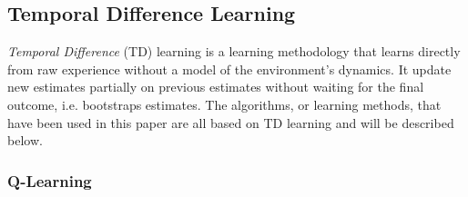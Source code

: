 \documentclass[result.tex]{subfiles}
\begin{document}


    \subsection*{Temporal Difference Learning}

    \textit{Temporal Difference} (TD) learning is a learning methodology that learns directly from raw experience without a model of the environment's dynamics. It update new estimates partially on previous estimates without waiting for the final outcome, i.e. bootstraps estimates. The algorithms, or learning methods, that have been used in this paper are all based on TD learning and will be described below.

    \subsubsection*{Q-Learning}
\end{document}
